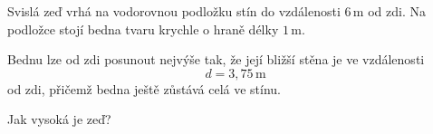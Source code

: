 \documentclass[12pt,a4paper]{article}
\begin{document}
\begin{exercise}

    Svislá zeď vrhá na vodorovnou podložku stín do vzdálenosti
    $6\,\mathrm{m}$ od zdi. Na podložce stojí bedna tvaru krychle
    o hraně délky $1\,\mathrm{m}$.

    Bednu lze od zdi posunout nejvýše tak, že její bližší stěna je
    ve vzdálenosti
    \[
        d=3{,}75\,\mathrm{m}
    \]
    od zdi, přičemž bedna ještě zůstává celá ve stínu.

    \begin{center}
    \end{center}

    Jak vysoká je zeď?

\end{exercise}


\end{document}
